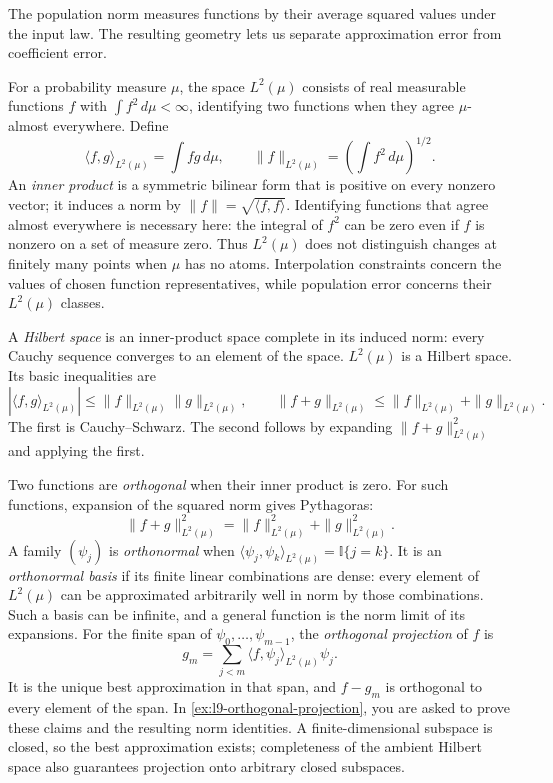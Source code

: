 \documentclass[11pt,twoside]{article}
\newcommand{\I}{\mathbb I}
\theoremstyle{definition}
\theoremstyle{remark}
\begin{document}
The population norm measures functions by their average squared values
under the input law. The resulting geometry lets us separate approximation
error from coefficient error.

For a probability measure $\mu$, the space $L^2(\mu)$ consists of real
measurable functions $f$ with $\int f^2\,d\mu<\infty$, identifying two
functions when they agree $\mu$-almost everywhere. Define
\[
 \langle f,g\rangle_{L^2(\mu)}=\int fg\,d\mu,\qquad
 \|f\|_{L^2(\mu)}=\left(\int f^2\,d\mu\right)^{1/2}.
\]
An \emph{inner product} is a symmetric bilinear form that is positive on
every nonzero vector; it induces a norm by
$\|f\|=\sqrt{\langle f,f\rangle}$. Identifying functions that agree
almost everywhere is necessary here: the integral of $f^2$ can be zero
even if $f$ is nonzero on a set of measure zero. Thus $L^2(\mu)$ does not
distinguish changes at finitely many points when $\mu$ has no atoms.
Interpolation constraints concern the values of chosen function
representatives, while population error concerns their $L^2(\mu)$ classes.

A \emph{Hilbert space} is an inner-product space complete in its induced
norm: every Cauchy sequence converges to an element of the space.
$L^2(\mu)$ is a Hilbert space. Its basic inequalities are
\[
 |\langle f,g\rangle_{L^2(\mu)}|
 \le\|f\|_{L^2(\mu)}\|g\|_{L^2(\mu)},\qquad
 \|f+g\|_{L^2(\mu)}\le\|f\|_{L^2(\mu)}+\|g\|_{L^2(\mu)}.
\]
The first is Cauchy--Schwarz. The second follows by expanding
$\|f+g\|_{L^2(\mu)}^2$ and applying the first.

Two functions are \emph{orthogonal} when their inner product is zero.
For such functions, expansion of the squared norm gives Pythagoras:
\[
 \|f+g\|_{L^2(\mu)}^2
 =\|f\|_{L^2(\mu)}^2+\|g\|_{L^2(\mu)}^2.
\]
A family $(\psi_j)$ is \emph{orthonormal} when
$\langle\psi_j,\psi_k\rangle_{L^2(\mu)}=\I\{j=k\}$.
It is an \emph{orthonormal basis} if its finite linear combinations are
dense: every element of $L^2(\mu)$ can be approximated arbitrarily well
in norm by those combinations. Such a basis can be infinite, and a
general function is the norm limit of its expansions.
For the finite span of $\psi_0,\ldots,\psi_{m-1}$, the
\emph{orthogonal projection} of $f$ is
\[
 g_m=\sum_{j<m}\langle f,\psi_j\rangle_{L^2(\mu)}\psi_j.
\]
It is the unique best approximation in that span, and $f-g_m$ is
orthogonal to every element of the span. In
\cref{ex:l9-orthogonal-projection}, you are asked to prove these claims
and the resulting norm identities. A finite-dimensional subspace is
closed, so the best approximation exists; completeness of the ambient
Hilbert space also guarantees projection onto arbitrary closed subspaces.
\end{document}
